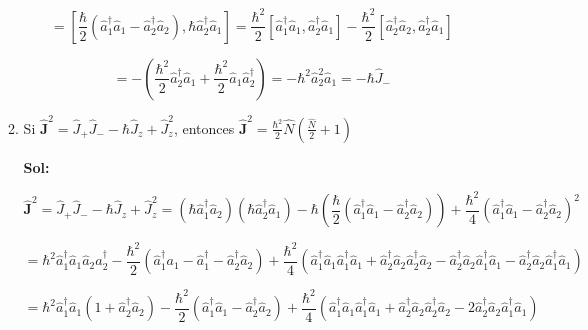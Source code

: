 \documentclass[12pt,a4paper]{article}
\begin{document}
\begin{enumerate}
\begin{enumerate}
    \begin{equation*}
        [\hat{J}_z , \hat{J}_{-}] = [\frac{\hbar}{2}(\hat{a}_{1}^{\dagger}\hat{a}_1 - \hat{a}_{2}^{\dagger}\hat{a}_{2}), \hbar \hat{a}_{2}^{\dagger} \hat{a}_{1} ] = \frac{\hbar^2}{2}[\hat{a}_{1}^{\dagger}\hat{a}_{1}, \hat{a}_{2}^{\dagger}\hat{a}_{1}] - \frac{\hbar^2}{2}[\hat{a}_{2}^{\dagger}\hat{a}_{2},\hat{a}_{2}^{\dagger}\hat{a}_{1}]
    \end{equation*}
    
    \begin{equation*}
        = -\left(\frac{\hbar^2}{2} \hat{a}_{2}^{\dagger} \hat{a}_{1} + \frac{\hbar^2}{2}\hat{a}_{1}\hat{a}_{2}^{\dagger}\right) = -\hbar^2 \hat{a}_{2}^{2} \hat{a}_{1} = - \hbar \hat{J}_{-}
    \end{equation*}
    
    
    \item Si $\mathbf{\hat{J}}^2 = \hat{J}_{+}\hat{J}_{-} - \hbar \hat{J}_{z} + \hat{J}_{z}^2$, entonces $\mathbf{\hat{J}}^2 = \frac{\hbar^2}{2}\hat{N}(\frac{\hat{N}}{2} + 1)$
    
    
    \textbf{Sol:}
    
    \begin{equation*}
        \mathbf{\hat{J}}^2 = \hat{J}_{+}\hat{J}_{-} - \hbar \hat{J}_{z} + \hat{J}_{z}^2 = (\hbar \hat{a}_{1}^{\dagger} \hat{a}_{2})(\hbar \hat{a}_{2}^{\dagger} \hat{a}_{1}) - \hbar \left(\frac{\hbar}{2}(\hat{a}_{1}^{\dagger} \hat{a}_{1} - \hat{a}_{2}^{\dagger} \hat{a}_{2})\right) + \frac{\hbar^2}{4}(\hat{a}_{1}^{\dagger}\hat{a}_{1} - \hat{a}_{2}^{\dagger} \hat{a}_{2})^2
    \end{equation*}
    
    \begin{equation*}
        = \hbar^2 \hat{a}_{1}^{\dagger}\hat{a}_{1} \hat{a}_{2} \hat{a}_{2}^{\dagger} - \frac{\hbar^2}{2} (\hat{a}_{1}^{\dagger} a_{1} - \hat{a}_{1}^{\dagger} - \hat{a}_{2}^{\dagger} \hat{a}_{2}) + \frac{\hbar^2}{4} (\hat{a}_{1}^{\dagger}\hat{a}_{1}\hat{a}_{1}^{\dagger} \hat{a}_{1} + \hat{a}_{2}^{\dagger}\hat{a}_{2}\hat{a}_{2}^{\dagger} \hat{a}_{2} - \hat{a}_{2}^{\dagger}\hat{a}_{2}\hat{a}_{1}^{\dagger} \hat{a}_{1} - \hat{a}_{2}^{\dagger}\hat{a}_{2}\hat{a}_{1}^{\dagger} \hat{a}_{1} )
    \end{equation*}
    
    \begin{equation*}
        = \hbar^2 \hat{a}_{1}^{\dagger} \hat{a}_{1} (1 + \hat{a}_{2}^{\dagger} \hat{a}_{2}) - \frac{\hbar^2}{2}(\hat{a}_{1}^{\dagger}\hat{a}_{1} - \hat{a}_{2}^{\dagger}\hat{a}_{2}) + \frac{\hbar^2}{4} (\hat{a}_{1}^{\dagger}\hat{a}_{1}\hat{a}_{1}^{\dagger} \hat{a}_{1} + \hat{a}_{2}^{\dagger}\hat{a}_{2}\hat{a}_{2}^{\dagger} \hat{a}_{2} - 2 \hat{a}_{2}^{\dagger}\hat{a}_{2}\hat{a}_{1}^{\dagger} \hat{a}_{1} )
    \end{equation*}
    

\end{enumerate}
\end{enumerate}
\end{document}
